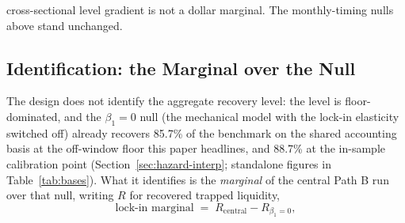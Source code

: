 \documentclass[12pt]{article}
\begin{document}
cross-sectional level gradient is not a dollar marginal. The monthly-timing nulls above stand unchanged.

\subsection{Identification: the Marginal over the Null}\label{sec:identification}

The design does not identify the aggregate recovery level: the level is floor-dominated, and the $\beta_1 = 0$ null (the mechanical model with the lock-in elasticity switched off) already recovers 85.7\% of the benchmark on the shared accounting basis at the off-window floor this paper headlines, and 88.7\% at the in-sample calibration point (Section~\ref{sec:hazard-interp}; standalone figures in Table~\ref{tab:bases}). What it identifies is the \emph{marginal} of the central Path B run over that null, writing $R$ for recovered trapped liquidity,
\begin{equation}\label{eq:marginal}
\text{lock-in marginal} \;=\; R_{\text{central}} - R_{\beta_1 = 0},
\end{equation}
\end{document}

